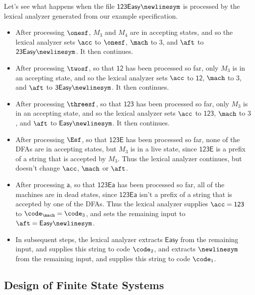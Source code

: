 Let's see what happens when the file $\mathsf{123Easy\newlinesym}$ is
processed by the lexical analyzer generated from our example
specification.
\begin{itemize}
\item After processing $\onesf$, $M_3$ and $M_4$ are in accepting
  states, and so the lexical analyzer sets $\acc$ to $\onesf$, $\mach$
  to $3$, and $\aft$ to $\mathsf{23Easy\newlinesym}$.  It then
  continues.

\item After processing $\twosf$, so that $\mathsf{12}$ has been
  processed so far, only $M_3$ is in an accepting state, and so the
  lexical analyzer sets $\acc$ to $\mathsf{12}$, $\mach$ to $3$, and
  $\aft$ to $\mathsf{3Easy\newlinesym}$.  It then continues.

\item After processing $\threesf$, so that $\mathsf{123}$ has been
  processed so far, only $M_3$ is in an accepting state, and so the
  lexical analyzer sets $\acc$ to $\mathsf{123}$, $\mach$ to $3$, and
  $\aft$ to $\mathsf{Easy\newlinesym}$.  It then continues.

\item After processing $\Esf$, so that $\mathsf{123E}$ has been
  processed so far, none of the DFAs are in accepting states, but
  $M_3$ is in a live state, since $\mathsf{123E}$ is a prefix of a
  string that is accepted by $M_3$.  Thus the lexical analyzer
  continues, but doesn't change $\acc$, $\mach$ or $\aft$.

\item After processing $\mathsf{a}$, so that $\mathsf{123Ea}$ has been
  processed so far, all of the machines are in dead states, since
  $\mathsf{123Ea}$ isn't a prefix of a string that is accepted by one
  of the DFAs.  Thus the lexical analyzer supplies $\acc=\mathsf{123}$
  to $\code_\mach=\code_3$, and sets the remaining input to
  $\aft=\mathsf{Easy\newlinesym}$.

\item In subsequent steps, the lexical analyzer extracts
  $\mathsf{Easy}$ from the remaining input, and supplies this string
  to code $\code_2$, and extracts $\newlinesym$ from the remaining
  input, and supplies this string to code $\code_1$.
\end{itemize}

\subsection*{Design of Finite State Systems}

